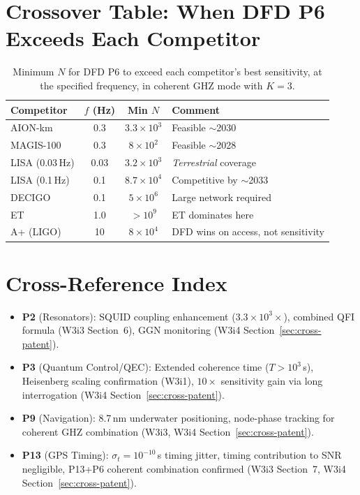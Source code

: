 \documentclass[11pt]{article}
\theoremstyle{definition}
\theoremstyle{remark}
\newcommand{\ee}[1]{\times10^{#1}}
\begin{document}
\section{Crossover Table: When DFD P6 Exceeds Each Competitor}

\begin{table}[h]
\centering
\caption{Minimum $N$ for DFD P6 to exceed each competitor's best sensitivity,
at the specified frequency, in coherent GHZ mode with $K=3$.}
\label{tab:crossover-full}
\begin{tabular}{@{}lccl@{}}
\toprule
Competitor & $f$ (Hz) & Min $N$ & Comment \\
\midrule
AION-km & 0.3 & $3.3\ee{3}$ & Feasible $\sim$2030 \\
MAGIS-100 & 0.3 & $8\ee{2}$ & Feasible $\sim$2028 \\
LISA (0.03\,Hz) & 0.03 & $3.2\ee{3}$ & \emph{Terrestrial} coverage \\
LISA (0.1\,Hz) & 0.1 & $8.7\ee{4}$ & Competitive by $\sim$2033 \\
DECIGO & 0.1 & $5\ee{6}$ & Large network required \\
ET & 1.0 & $>10^9$ & ET dominates here \\
A+ (LIGO) & 10 & $8\ee{4}$ & DFD wins on access, not sensitivity \\
\bottomrule
\end{tabular}
\end{table}

\section{Cross-Reference Index}

\begin{itemize}
\item \textbf{P2} (Resonators): SQUID coupling enhancement ($3.3\ee{3}\times$),
  combined QFI formula (W3i3 Section~6), GGN monitoring (W3i4 Section~\ref{sec:cross-patent}).
\item \textbf{P3} (Quantum Control/QEC): Extended coherence time ($T > 10^3$\,s),
  Heisenberg scaling confirmation (W3i1), $10\times$ sensitivity gain via
  long interrogation (W3i4 Section~\ref{sec:cross-patent}).
\item \textbf{P9} (Navigation): 8.7\,nm underwater positioning, node-phase
  tracking for coherent GHZ combination (W3i3, W3i4 Section~\ref{sec:cross-patent}).
\item \textbf{P13} (GPS Timing): $\sigma_t = 10^{-10}$\,s timing jitter,
  timing contribution to SNR negligible, P13+P6 coherent combination
  confirmed (W3i3 Section~7, W3i4 Section~\ref{sec:cross-patent}).
\end{itemize}
\end{document}
